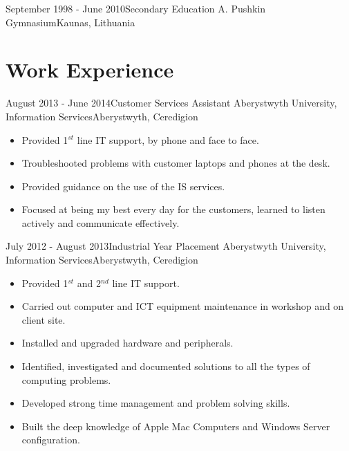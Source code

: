 \documentclass[11pt,a4paper]{moderncv}
\begin{document}
\cventry
	{September 1998 - June 2010}{Secondary Education}
	{A. Pushkin Gymnasium}{Kaunas, Lithuania}
	{}{}
		
\section{Work Experience}

\cventry
	{August 2013 - June 2014}{Customer Services Assistant}
	{Aberystwyth University, Information Services}{Aberystwyth, Ceredigion}
	{}{
        \begin{itemize}
            \item Provided 1$^{st}$ line IT support, by phone and face to face.
            \item Troubleshooted problems with customer laptops and phones at the desk.
            \item Provided guidance on the use of the IS services.
            \item Focused at being my best every day for the customers, learned to listen actively and communicate effectively.
        \end{itemize}
    }
	
\cventry
	{July 2012 - August 2013}{Industrial Year Placement}
	{Aberystwyth University, Information Services}{Aberystwyth, Ceredigion}
	{}{
        \begin{itemize}
            \item Provided 1$^{st}$ and 2$^{nd}$ line IT support.
            \item Carried out computer and ICT equipment maintenance in workshop and on client site.
            \item Installed and upgraded hardware and peripherals.
            \item Identified, investigated and documented solutions to all the types of computing problems.
            \item Developed strong time management and problem solving skills.
            \item Built the deep knowledge of Apple Mac Computers and Windows Server configuration. 
        \end{itemize}
    }
    
\end{document}
